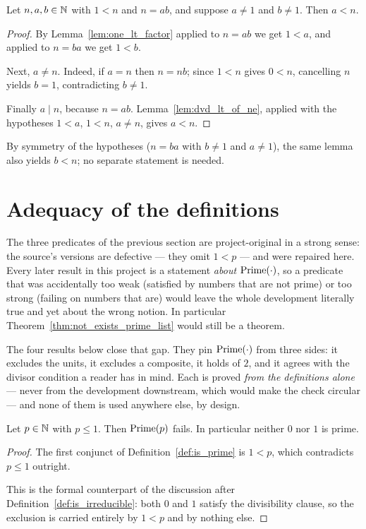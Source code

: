 \begin{lemma}
  \leanok
  \label{lem:factor_lt}
  Let $n, a, b \in \mathbb{N}$ with $1 < n$ and $n = a b$, and suppose $a \neq 1$ and
  $b \neq 1$. Then $a < n$.
\end{lemma}
\begin{proof}
  \leanok
  By Lemma~\ref{lem:one_lt_factor} applied to $n = a b$ we get $1 < a$, and
  applied to $n = b a$ we get $1 < b$.

  Next, $a \neq n$. Indeed, if $a = n$ then $n = n b$; since $1 < n$ gives
  $0 < n$, cancelling $n$ yields $b = 1$, contradicting $b \neq 1$.

  Finally $a \mid n$, because $n = a b$. Lemma~\ref{lem:dvd_lt_of_ne}, applied
  with the hypotheses $1 < a$, $1 < n$, $a \neq n$, gives $a < n$.
\end{proof}

By symmetry of the hypotheses ($n = b a$ with $b \neq 1$ and $a \neq 1$), the
same lemma also yields $b < n$; no separate statement is needed.

\section{Adequacy of the definitions}

The three predicates of the previous section are project-original in a strong
sense: the source's versions are defective --- they omit $1 < p$ --- and were
repaired here. Every later result in this project is a statement \emph{about}
$\mathrm{Prime}(\cdot)$, so a predicate that was accidentally too weak (satisfied by
numbers that are not prime) or too strong (failing on numbers that are) would
leave the whole development literally true and yet about the wrong notion. In
particular Theorem~\ref{thm:not_exists_prime_list} would still be a theorem.

The four results below close that gap. They pin $\mathrm{Prime}(\cdot)$ from three sides:
it excludes the units, it excludes a composite, it holds of $2$, and it agrees
with the divisor condition a reader has in mind. Each is proved \emph{from the
definitions alone} --- never from the development downstream, which would make
the check circular --- and none of them is used anywhere else, by design.

\begin{lemma}
  \leanok
  \label{lem:not_is_prime_of_le_one}
  Let $p \in \mathbb{N}$ with $p \le 1$. Then $\mathrm{Prime}(p)$ fails. In particular neither
  $0$ nor $1$ is prime.
\end{lemma}
\begin{proof}
  \leanok
  The first conjunct of Definition~\ref{def:is_prime} is $1 < p$, which
  contradicts $p \le 1$ outright.

  This is the formal counterpart of the discussion after
  Definition~\ref{def:is_irreducible}: both $0$ and $1$ satisfy the divisibility
  clause, so the exclusion is carried entirely by $1 < p$ and by nothing else.
\end{proof}

